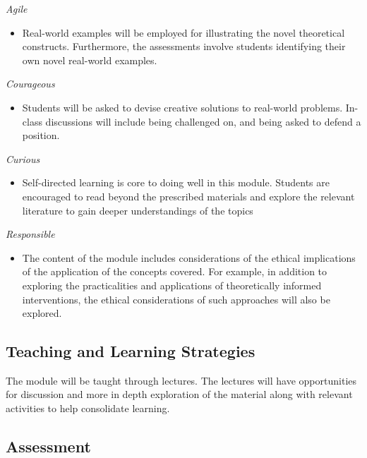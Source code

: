\documentclass[
  x11names]{article}
\providecommand{\tightlist}{%
  \setlength{\itemsep}{0pt}\setlength{\parskip}{0pt}}
\begin{document}
\emph{Agile}

\begin{itemize}
\tightlist
\item
  Real-world examples will be employed for illustrating the novel
  theoretical constructs. Furthermore, the assessments involve students
  identifying their own novel real-world examples.
\end{itemize}

\emph{Courageous}

\begin{itemize}
\tightlist
\item
  Students will be asked to devise creative solutions to real-world
  problems. In-class discussions will include being challenged on, and
  being asked to defend a position.
\end{itemize}

\emph{Curious}

\begin{itemize}
\tightlist
\item
  Self-directed learning is core to doing well in this module. Students
  are encouraged to read beyond the prescribed materials and explore the
  relevant literature to gain deeper understandings of the topics
\end{itemize}

\emph{Responsible}

\begin{itemize}
\tightlist
\item
  The content of the module includes considerations of the ethical
  implications of the application of the concepts covered. For example,
  in addition to exploring the practicalities and applications of
  theoretically informed interventions, the ethical considerations of
  such approaches will also be explored.
\end{itemize}

\subsection{Teaching and Learning
Strategies}\label{teaching-and-learning-strategies}

The module will be taught through lectures. The lectures will have
opportunities for discussion and more in depth exploration of the
material along with relevant activities to help consolidate learning.

\subsection{Assessment}\label{assessment}
\end{document}
